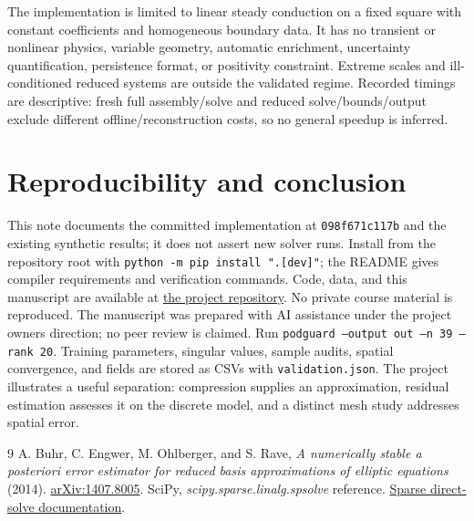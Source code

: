 \documentclass[10pt,a4paper]{article}
\begin{document}
The implementation is limited to linear steady conduction on a fixed square with constant coefficients and homogeneous boundary data. It has no transient or nonlinear physics, variable geometry, automatic enrichment, uncertainty quantification, persistence format, or positivity constraint. Extreme scales and ill-conditioned reduced systems are outside the validated regime. Recorded timings are descriptive: fresh full assembly/solve and reduced solve/bounds/output exclude different offline/reconstruction costs, so no general speedup is inferred.
\section{Reproducibility and conclusion}
This note documents the committed implementation at \texttt{098f671c117b} and the existing synthetic results; it does not assert new solver runs. Install from the repository root with \texttt{python -m pip install ".[dev]"}; the README gives compiler requirements and verification commands. Code, data, and this manuscript are available at \href{https://github.com/racostacme-come/podguard}{the project repository}. No private course material is reproduced. The manuscript was prepared with AI assistance under the project owner\textquotesingle s direction; no peer review is claimed.
Run \texttt{podguard --output out --n 39 --rank 20}. Training parameters, singular values, sample audits, spatial convergence, and fields are stored as CSVs with \texttt{validation.json}. The project illustrates a useful separation: compression supplies an approximation, residual estimation assesses it on the discrete model, and a distinct mesh study addresses spatial error.
\begin{thebibliography}{9}
 A. Buhr, C. Engwer, M. Ohlberger, and S. Rave, \emph{A numerically stable a posteriori error estimator for reduced basis approximations of elliptic equations} (2014). \href{https://arxiv.org/abs/1407.8005}{arXiv:1407.8005}.
 SciPy, \emph{scipy.sparse.linalg.spsolve} reference. \href{https://docs.scipy.org/doc/scipy/reference/generated/scipy.sparse.linalg.spsolve.html}{Sparse direct-solve documentation}.
\end{thebibliography}
\end{document}
